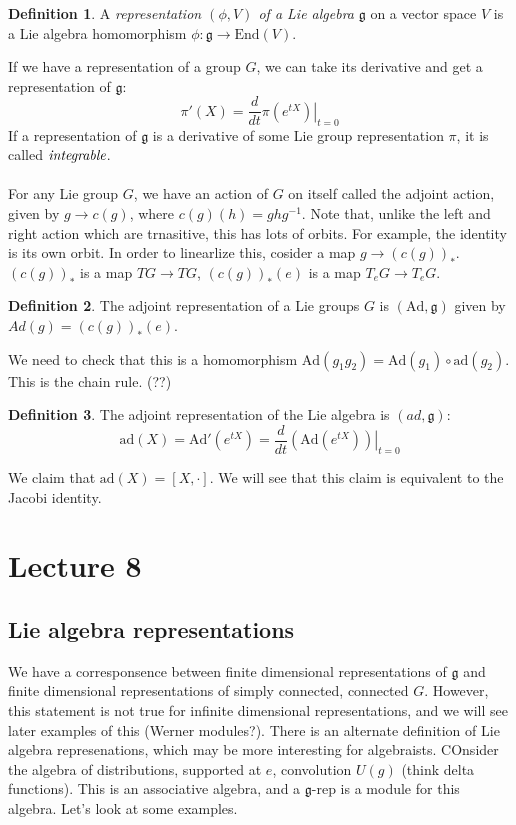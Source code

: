 \documentclass[12 pt]{article}
\theoremstyle{plain}
\theoremstyle{definition}
\newtheorem{defn}{Definition}
\theoremstyle{remark}
\begin{document}
\begin{defn}
A \emph{representation $(\phi,V)$ of a Lie algebra} $\mathfrak{g}$ on a vector space $V$ is a Lie algebra homomorphism $\phi:\mathfrak{g} \to \text{End}(V)$.
\end{defn}
If we have a representation of a group $G$, we can take its derivative and get a representation of $\mathfrak{g}$:
\[       \pi'(X) = \frac{d}{dt} \left. \pi(e^{tX}) \right|_{t=0}      \]
If a representation of $\mathfrak{g}$ is a derivative of some Lie group representation $\pi$, it is called $\emph{integrable}$.
\\
\\
For any Lie group $G$, we have an action of $G$ on itself called the adjoint action, given by $g \to c(g)$, where $c(g) (h) = ghg^{-1}$. Note that, unlike the left and right action which are trnasitive, this has lots of orbits. For example, the identity is its own orbit. In order to linearlize this, cosider a map $g \to (c(g))_*$. $(c(g))_*$ is a map $TG \to TG$, $(c(g))_* (e)$ is a map $T_eG \to T_eG$.

\begin{defn}
The adjoint representation of a Lie groups $G$ is $(\text{Ad}, \mathfrak{g})$ given by $Ad(g) = (c(g))_* (e)$.
\end{defn}
We need to check that this is a homomorphism $\text{Ad}(g_1g_2) = \text{Ad}(g_1) \circ \text{ad}(g_2)$. This is the chain rule. (??)

\begin{defn}
The adjoint representation of the Lie algebra is $(ad, \mathfrak{g})$:
\[     \text{ad}(X) = \text{Ad}' (e^{tX}) = \frac{d}{dt} \left. (\text{Ad}(e^{tX}))\right|_{t=0}    \]
\end{defn}
We claim that $\text{ad}(X) = [X, \cdot]$. We will see that this claim is equivalent to the Jacobi identity.


\section*{Lecture 8}

\subsection*{Lie algebra representations}
We have a corresponsence between finite dimensional representations of $\mathfrak g$ and finite dimensional representations of simply connected, connected $G$. However, this statement is not true for infinite dimensional representations, and we will see later examples of this (Werner modules?). There is an alternate definition of Lie algebra represenations, which may be more interesting for algebraists. COnsider the algebra of distributions, supported at $e$, convolution $U(g)$ (think delta functions). This is an associative algebra, and a $\mathfrak g$-rep is a module for this algebra. Let's look at some examples.
\end{document}
